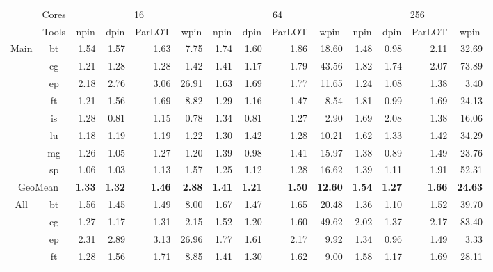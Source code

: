 \begin{tabular}{|c|c|rrrr|rrrr|rrrr|}
\hline
\multicolumn{1}{|l|}{\multirow{2}{*}{}} & Cores & \multicolumn{4}{c|}{16} & \multicolumn{4}{c|}{64} & \multicolumn{4}{c|}{256} \\ \cline{2-14} 
\multicolumn{1}{|l|}{} & Tools & \multicolumn{1}{c}{npin} & \multicolumn{1}{c}{dpin} & \multicolumn{1}{c}{ParLOT} & \multicolumn{1}{c|}{wpin} & \multicolumn{1}{c}{npin} & \multicolumn{1}{c}{dpin} & \multicolumn{1}{c}{ParLOT} & \multicolumn{1}{c|}{wpin} & \multicolumn{1}{c}{npin} & \multicolumn{1}{c}{dpin} & \multicolumn{1}{c}{ParLOT} & \multicolumn{1}{c|}{wpin} \\ \cline{2-14} 
\multirow{8}{*}{Main} & bt & 1.54 & 1.57 & 1.63 & 7.75 & 1.74 & 1.60 & 1.86 & 18.60 & 1.48 & 0.98 & 2.11 & 32.69 \\
 & cg & 1.21 & 1.28 & 1.28 & 1.42 & 1.41 & 1.17 & 1.79 & 43.56 & 1.82 & 1.74 & 2.07 & 73.89 \\
 & ep & 2.18 & 2.76 & 3.06 & 26.91 & 1.63 & 1.69 & 1.77 & 11.65 & 1.24 & 1.08 & 1.38 & 3.40 \\
 & ft & 1.21 & 1.56 & 1.69 & 8.82 & 1.29 & 1.16 & 1.47 & 8.54 & 1.81 & 0.99 & 1.69 & 24.13 \\
 & is & 1.28 & 0.81 & 1.15 & 0.78 & 1.34 & 0.81 & 1.27 & 2.90 & 1.69 & 2.08 & 1.38 & 16.06 \\
 & lu & 1.18 & 1.19 & 1.19 & 1.22 & 1.30 & 1.42 & 1.28 & 10.21 & 1.62 & 1.33 & 1.42 & 34.29 \\
 & mg & 1.26 & 1.05 & 1.27 & 1.20 & 1.39 & 0.98 & 1.41 & 15.97 & 1.38 & 0.89 & 1.49 & 23.76 \\
 & sp & 1.06 & 1.03 & 1.13 & 1.57 & 1.25 & 1.12 & 1.28 & 16.62 & 1.39 & 1.11 & 1.91 & 52.31 \\ \hline
\multicolumn{2}{|c|}{GeoMean} & \textbf{1.33} & \textbf{1.32} & \textbf{1.46} & \textbf{2.88} & \textbf{1.41} & \textbf{1.21} & \textbf{1.50} & \textbf{12.60} & \textbf{1.54} & \textbf{1.27} & \textbf{1.66} & \textbf{24.63} \\ \hline
\multirow{8}{*}{All} & bt & 1.56 & 1.45 & 1.49 & 8.00 & 1.67 & 1.47 & 1.65 & 20.48 & 1.36 & 1.10 & 1.52 & 39.70 \\
 & cg & 1.27 & 1.17 & 1.31 & 2.15 & 1.52 & 1.20 & 1.60 & 49.62 & 2.02 & 1.37 & 2.17 & 83.40 \\
 & ep & 2.31 & 2.89 & 3.13 & 26.96 & 1.77 & 1.61 & 2.17 & 9.92 & 1.34 & 0.96 & 1.49 & 3.33 \\
 & ft & 1.28 & 1.56 & 1.71 & 8.85 & 1.41 & 1.30 & 1.62 & 9.00 & 1.58 & 1.17 & 1.69 & 28.11 \\

\end{tabular}
